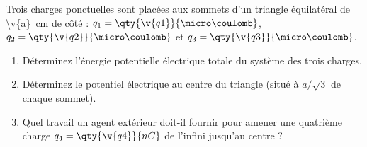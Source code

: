 Trois charges ponctuelles sont placées aux sommets d'un triangle équilatéral de \qty{\v{a}}{cm} de côté : $q_1 = \qty{\v{q1}}{\micro\coulomb}$, $q_2 = \qty{\v{q2}}{\micro\coulomb}$ et $q_3 = \qty{\v{q3}}{\micro\coulomb}$.

\begin{enumerate}[label=\alph*)]
    \item Déterminez l'énergie potentielle électrique totale du système des trois charges.
    \item Déterminez le potentiel électrique au centre du triangle (situé à $a/\sqrt{3}$ de chaque sommet).
    \item Quel travail un agent extérieur doit-il fournir pour amener une quatrième charge $q_4 = \qty{\v{q4}}{nC}$ de l'infini jusqu'au centre ?
\end{enumerate}
